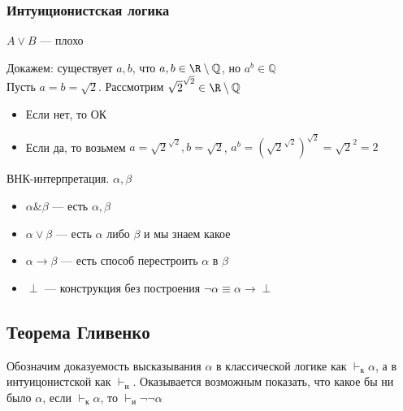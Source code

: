 \documentclass[english]{article}
\begin{document}
\subsubsection{Интуиционистская логика}
\label{sec:orgcc7646d}
\(A \vee B\) --- плохо
\begin{examp}
	Докажем: существует \(a, b\), что \(a, b \in \R \setminus \mathbb{Q}\), но \(a^b \in \mathbb{Q}\) \\
	Пусть \(a = b = \sqrt{2}\). Рассмотрим \(\sqrt{2}^{\sqrt{2}} \in \R \setminus \mathbb{Q}\)
	\begin{itemize}
		\item Если нет, то ОК
		\item Если да, то возьмем \(a = \sqrt{2}^{\sqrt{2}}, b = \sqrt{2}\), \(a^b = (\sqrt{2}^{\sqrt{2}})^{\sqrt{2}} = \sqrt{2}^{2} = 2\)
	\end{itemize}
\end{examp}
\begin{defintion}
	ВНК-интерпретация. \(\alpha, \beta\)
	\begin{itemize}
		\item \(\alpha \& \beta\) --- есть \(\alpha, \beta\)
		\item \(\alpha \vee \beta\) --- есть \(\alpha\) либо \(\beta\) и мы знаем какое
		\item \(\alpha \to \beta\) --- есть способ перестроить \(\alpha\) в \(\beta\)
		\item \(\perp\) --- конструкция без построения \(\neg \alpha \equiv \alpha \to \perp\)
	\end{itemize}
\end{defintion}
\subsection{Теорема Гливенко}
\label{sec:org6b650dd}
\begin{theorem}
	Обозначим доказуемость высказывания \(\alpha\) в классической логике как \(\vdash_{\text{к}} \alpha\), а в интуицонистской как \(\vdash_{\text{и}}\). Оказывается возможным показать, что какое бы ни было \(\alpha\), если \(\vdash_{\text{к}} \alpha\), то \(\vdash_{\text{и}} \neg\neg \alpha\)
\end{theorem}
\end{document}
